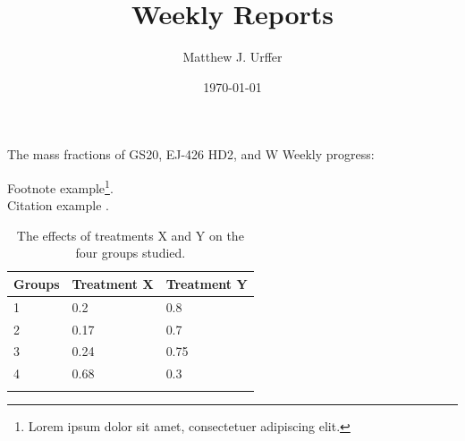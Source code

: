 \documentclass[paper=a4,twoside,captions=tableheading,index=totoc,hyperref]{labbook}
\begin{document}
\title{Weekly Reports}
\author{Matthew J. Urffer}
\date{\today}
\maketitle

\listoftodos
\printnomenclature
\printindex
\tableofcontents
\listoffigures
\listoftables
\lstlistoflistings

\newpage %

\pagestyle{scrheadings} %


The mass fractions of GS20, EJ-426 HD2, and W
Weekly progress:

\lipsum[1]



\lipsum[2]

Footnote example\footnote{Lorem ipsum dolor sit amet, consectetuer adipiscing elit.}.\\

Citation example \cite{lamport94}.



\lipsum[3]

\begin{table}
\label{tab:treatments_xy}
\raggedleft
\begin{tabular}{l l l}
\toprule
\textbf{Groups} & \textbf{Treatment X} & \textbf{Treatment Y} \\
\toprule
1 & 0.2 & 0.8\\
2 & 0.17 & 0.7\\
3 & 0.24 & 0.75\\
4 & 0.68 & 0.3\\
\bottomrule\\
\end{tabular}
\caption{The effects of treatments X and Y on the four groups studied.}
\end{table}
\end{document}
